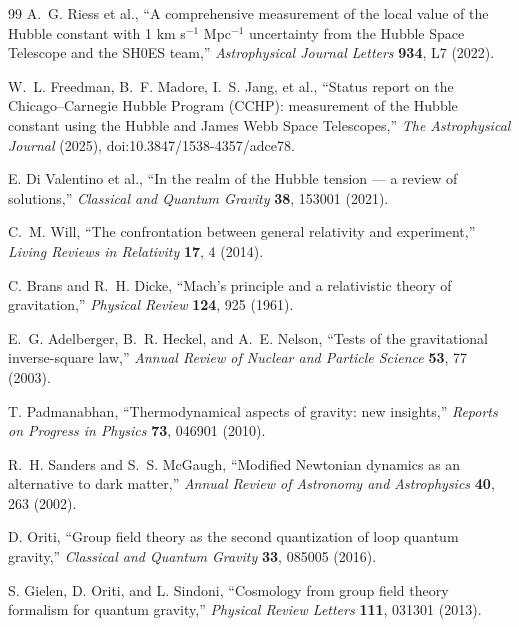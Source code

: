 \documentclass[11pt]{article}
\begin{document}
\begin{thebibliography}{99}
A.~G. Riess et al.,
``A comprehensive measurement of the local value of the Hubble constant with 1 km s$^{-1}$ Mpc$^{-1}$ uncertainty from the Hubble Space Telescope and the SH0ES team,''
\emph{Astrophysical Journal Letters} \textbf{934}, L7 (2022).

W.~L. Freedman, B.~F. Madore, I.~S. Jang, et al.,
``Status report on the Chicago--Carnegie Hubble Program (CCHP): measurement of the Hubble constant using the Hubble and James Webb Space Telescopes,''
\emph{The Astrophysical Journal} (2025), doi:10.3847/1538-4357/adce78.

E. Di Valentino et al.,
``In the realm of the Hubble tension --- a review of solutions,''
\emph{Classical and Quantum Gravity} \textbf{38}, 153001 (2021).

C.~M. Will,
``The confrontation between general relativity and experiment,''
\emph{Living Reviews in Relativity} \textbf{17}, 4 (2014).

C. Brans and R.~H. Dicke,
``Mach's principle and a relativistic theory of gravitation,''
\emph{Physical Review} \textbf{124}, 925 (1961).

E.~G. Adelberger, B.~R. Heckel, and A.~E. Nelson,
``Tests of the gravitational inverse-square law,''
\emph{Annual Review of Nuclear and Particle Science} \textbf{53}, 77 (2003).

T. Padmanabhan,
``Thermodynamical aspects of gravity: new insights,''
\emph{Reports on Progress in Physics} \textbf{73}, 046901 (2010).

R.~H. Sanders and S.~S. McGaugh,
``Modified Newtonian dynamics as an alternative to dark matter,''
\emph{Annual Review of Astronomy and Astrophysics} \textbf{40}, 263 (2002).

D. Oriti,
``Group field theory as the second quantization of loop quantum gravity,''
\emph{Classical and Quantum Gravity} \textbf{33}, 085005 (2016).

S. Gielen, D. Oriti, and L. Sindoni,
``Cosmology from group field theory formalism for quantum gravity,''
\emph{Physical Review Letters} \textbf{111}, 031301 (2013).


\end{thebibliography}
\end{document}
